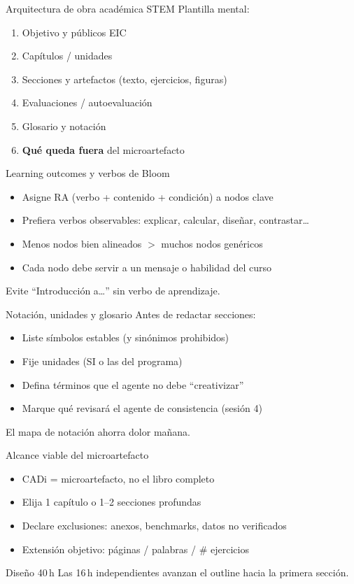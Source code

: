 \documentclass[aspectratio=169,11pt]{beamer}
\begin{document}
\begin{frame}{Arquitectura de obra académica STEM}
Plantilla mental:
\begin{enumerate}
\item Objetivo y públicos EIC
\item Capítulos / unidades
\item Secciones y artefactos (texto, ejercicios, figuras)
\item Evaluaciones / autoevaluación
\item Glosario y notación
\item \textbf{Qué queda fuera} del microartefacto
\end{enumerate}
\end{frame}

\begin{frame}{Learning outcomes y verbos de Bloom}
\begin{itemize}
\item Asigne RA (verbo + contenido + condición) a nodos clave
\item Prefiera verbos observables: explicar, calcular, diseñar, contrastar\ldots
\item Menos nodos bien alineados $>$ muchos nodos genéricos
\item Cada nodo debe servir a un mensaje o habilidad del curso
\end{itemize}
\begin{alertblock}{Evite}
``Introducción a\ldots'' sin verbo de aprendizaje.
\end{alertblock}
\end{frame}

\begin{frame}{Notación, unidades y glosario}
Antes de redactar secciones:
\begin{itemize}
\item Liste símbolos estables (y sinónimos prohibidos)
\item Fije unidades (SI o las del programa)
\item Defina términos que el agente no debe ``creativizar''
\item Marque qué revisará el agente de consistencia (sesión 4)
\end{itemize}
El mapa de notación ahorra dolor mañana.
\end{frame}

\begin{frame}{Alcance viable del microartefacto}
\begin{itemize}
\item CADi = microartefacto, no el libro completo
\item Elija 1 capítulo o 1--2 secciones profundas
\item Declare exclusiones: anexos, benchmarks, datos no verificados
\item Extensión objetivo: páginas / palabras / \# ejercicios
\end{itemize}
\begin{block}{Diseño 40\,h}
Las 16\,h independientes avanzan el outline hacia la primera sección.
\end{block}
\end{frame}
\end{document}

